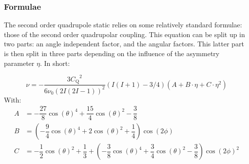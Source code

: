 \documentclass[11pt,a4paper]{article}
\begin{document}
\subsubsection*{Formulae}
The second order quadrupole static relies on some relatively standard formulae: those of the second order quadrupolar coupling. This equation can be split up in two parts: an angle independent factor, and the angular factors. This latter part is then split in three parts depending on the influence of the asymmetry parameter $\eta$. In short:

\begin{equation}
\nu = -\dfrac{3{C_\text{Q}}^2}{6\nu_0(2I(2I-1))^2}(I(I+1)-3/4)(A+B\cdot\eta+C\cdot\eta^2)
\end{equation}
With:
\begin{align}
A &= -\dfrac{27}{8}\cos(\theta)^4+\dfrac{15}{4}\cos(\theta)^2-\dfrac{3}{8} \\
B &= \left(-\dfrac{9}{4}\cos(\theta)^4+2\cos(\theta)^2+\dfrac{1}{4}\right)\cos(2\phi) \\
C &=-\dfrac{1}{2}\cos(\theta)^2+\dfrac{1}{3}+\left(-\dfrac{3}{8}\cos(\theta)^4+\dfrac{3}{4}\cos(\theta)^2-\dfrac{3}{8}\right)\cos(2\phi)^2
\end{align}







\end{document}
